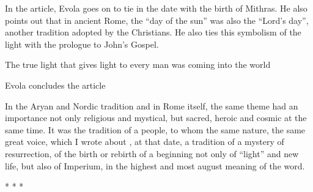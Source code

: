 In the article, Evola goes on to tie in the date with the birth of Mithras. He also points out that in ancient Rome, the ``day of the sun'' was also the ``Lord's day'', another tradition adopted by the Christians. He also ties this symbolism of the light with the prologue to John's Gospel.

\begin{quotex}
The true light that gives light to every man was coming into the world
\end{quotex}


Evola concludes the article

\begin{quotex}
In the Aryan and Nordic tradition and in Rome itself, the same theme had an importance not only religious and mystical, but sacred, heroic and cosmic at the same time. It was the tradition of a people, to whom the same nature, the same great voice, which I wrote about , at that date, a tradition of a mystery of resurrection, of the birth or rebirth of a beginning not only of ``light'' and new life, but also of Imperium, in the highest and most august meaning of the word.
\end{quotex}




\begin{center}* * *\end{center}

